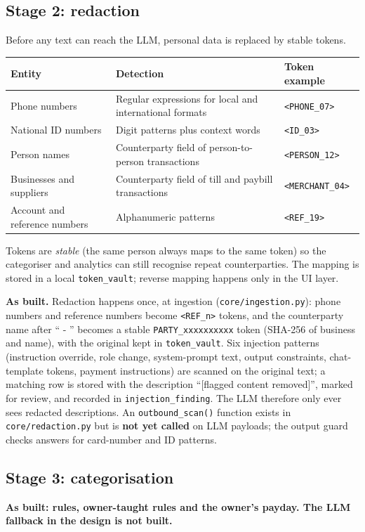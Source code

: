 \documentclass[10pt,a4paper]{article}
\newcommand{\code}[1]{\texttt{\small #1}}
\begin{document}
\subsection{Stage 2: redaction}
\label{sec:redaction}
Before any text can reach the LLM, personal data is replaced by stable tokens.

\begin{center}
\begin{tabularx}{\textwidth}{@{}p{3.2cm}p{4.6cm}Y@{}}
\toprule
\textbf{Entity} & \textbf{Detection} & \textbf{Token example}\\
\midrule
Phone numbers & Regular expressions for local and international formats & \code{<PHONE\_07>}\\
National ID numbers & Digit patterns plus context words & \code{<ID\_03>}\\
Person names & Counterparty field of person-to-person transactions & \code{<PERSON\_12>}\\
Businesses and suppliers & Counterparty field of till and paybill transactions & \code{<MERCHANT\_04>}\\
Account and reference numbers & Alphanumeric patterns & \code{<REF\_19>}\\
\bottomrule
\end{tabularx}
\end{center}
Tokens are \emph{stable} (the same person always maps to the same token) so the categoriser and analytics can still recognise repeat counterparties. The mapping is stored in a local \code{token\_vault}; reverse mapping happens only in the UI layer.

\textbf{As built.} Redaction happens once, at ingestion (\code{core/ingestion.py}): phone numbers and reference numbers become \code{<REF\_n>} tokens, and the counterparty name after `` - '' becomes a stable \code{PARTY\_xxxxxxxxxx} token (SHA-256 of business and name), with the original kept in \code{token\_vault}. Six injection patterns (instruction override, role change, system-prompt text, output constraints, chat-template tokens, payment instructions) are scanned on the original text; a matching row is stored with the description ``[flagged content removed]'', marked for review, and recorded in \code{injection\_finding}. The LLM therefore only ever sees redacted descriptions. An \code{outbound\_scan()} function exists in \code{core/redaction.py} but is \textbf{not yet called} on LLM payloads; the output guard checks answers for card-number and ID patterns.

\subsection{Stage 3: categorisation}
\textbf{As built: rules, owner-taught rules and the owner's payday. The LLM fallback in the design is not built.}
\end{document}
